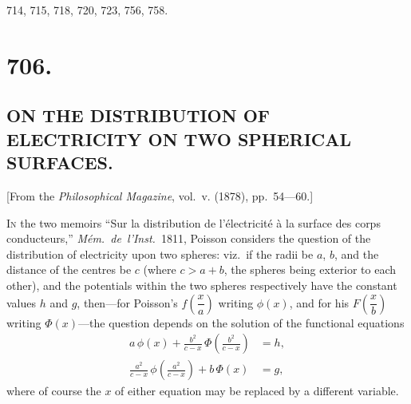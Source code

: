 \documentclass[12pt,a4paper,oneside]{book}
\begin{document}
\begin{list}{}{%
  \setlength{\leftmargin}{2em}\setlength{\itemsep}{0pt}%
  \setlength{\parsep}{0pt}\setlength{\topsep}{0.3em}}
\item 714, 715, 718, 720, 723, 756, 758.
\end{list}

\clearpage

\mainmatter
\setcounter{page}{1}

\fancyhf{}\fancyhead[L]{}\fancyhead[R]{\textbf{\thepage}}

\fancyhead[L]{\textbf{706]}}

\section*{706.}
\subsection*{ON THE DISTRIBUTION OF ELECTRICITY ON TWO SPHERICAL SURFACES.}

\begin{center}
[From the \textit{Philosophical Magazine}, vol.~v. (1878), pp.~54---60.]
\end{center}

\medskip

\textsc{In} the two memoirs ``Sur la distribution de l'\'electricit\'e \`a la surface des corps conducteurs,'' \textit{M\'em.~de~l'Inst.}\ 1811, Poisson considers the question of the distribution of electricity upon two spheres: viz.\ if the radii be $a$, $b$, and the distance of the centres be $c$ (where $c > a + b$, the spheres being exterior to each other), and the potentials within the two spheres respectively have the constant values $h$ and $g$, then---for Poisson's $f\!\left(\dfrac{x}{a}\right)$ writing $\phi(x)$, and for his $F\!\left(\dfrac{x}{b}\right)$ writing $\Phi(x)$---the question depends on the solution of the functional equations
\begin{align*}
a\,\phi(x) + \frac{b^2}{c-x}\,\Phi\!\left(\frac{b^2}{c-x}\right) &= h,\\
\frac{a^2}{c-x}\,\phi\!\left(\frac{a^2}{c-x}\right) + b\,\Phi(x) &= g,
\end{align*}
where of course the $x$ of either equation may be replaced by a different variable.
\end{document}

